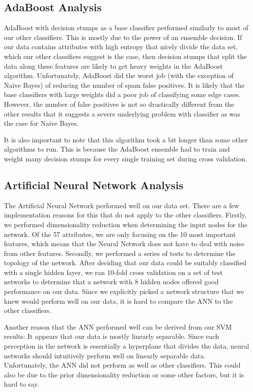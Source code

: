 \documentclass[11pt,oneside,reqno]{amsart}
\theoremstyle{definition}
\theoremstyle{definition}
\theoremstyle{remark}
\numberwithin{equation}{section}
\numberwithin{equation}{section}
\begin{document}
\subsection{AdaBoost Analysis}
AdaBoost with decision stumps as a base classifier performed similarly to most of our other classifiers. This is mostly due to the power of an ensemble decision. If our data contains attributes with high entropy that nicely divide the data set, which our other classifiers suggest is the case, then decision stumps that split the data along these features are likely to get heavy weights in the AdaBoost algorithm.  Unfortunately, AdaBoost did the worst job (with the exception of Naive Bayes) of reducing the number of spam false positives. It is likely that the base classifiers with large weights did a poor job of classifying some edge cases. However, the number of false positives is not so drastically different from the other results that it suggests a severe underlying problem with classifier as was the case for Naive Bayes.

It is also important to note that this algorithm took a bit longer than some other algorithms to run. This is because the AdaBoost ensemble had to train and weight many decision stumps for every single training set during cross validation.

\subsection{Artificial Neural Network Analysis}
The Artificial Neural Network performed well on our data set. There are a few implementation reasons for this that do not apply to the other classifiers. Firstly, we performed dimensionality reduction when determining the input nodes for the network. Of the 57 attributes, we are only focusing on the 10 most important features, which means that the Neural Network does not have to deal with noise from other features. Secondly, we performed a series of tests to determine the topology of the network. After deciding that our data could be suitably classified with a single hidden layer, we ran 10-fold cross validation on a set of test networks to determine that a network with 8 hidden nodes offered good performance on our data. Since we explicitly picked a network structure that we knew would perform well on our data, it is hard to compare the ANN to the other classifiers.

Another reason that the ANN performed well can be derived from our SVM results: It appears that our data is mostly linearly separable. Since each perception in the network is essentially a hyperplane that divides the data, neural networks should intuitively perform well on linearly separable data. Unfortunately, the ANN did not perform as well as other classifiers. This could also be due to the prior dimensionality reduction or some other factors, but it is hard to say.
\end{document}
